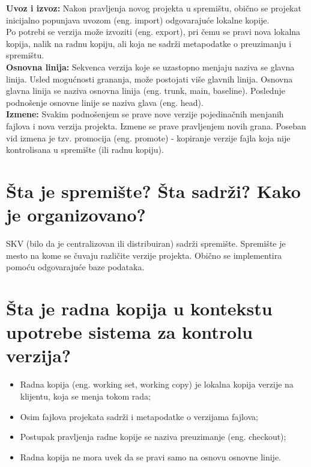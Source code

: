 \documentclass[a4paper]{article}
\begin{document}
  \textbf{Uvoz i izvoz:} Nakon pravljenja novog projekta u spremištu, obično se projekat inicijalno 
  popunjava uvozom (eng. import) odgovarajuće lokalne kopije.\\
  \indent Po potrebi se verzija može izvoziti (eng. export), pri čemu se pravi nova lokalna kopija, 
  nalik na radnu kopiju, ali koja ne sadrži metapodatke o preuzimanju i spremištu.\\
  
  \textbf{Osnovna linija:} Sekvenca verzija koje se uzastopno menjaju naziva se glavna linija. 
  Usled mogućnosti grananja, može postojati više glavnih linija. Osnovna glavna linija se naziva 
  osnovna linija (eng. trunk, main, baseline). Poslednje podnošenje osnovne linije se naziva 
  glava (eng. head).\\
  
  \textbf{Izmene:} Svakim podnošenjem se prave nove verzije pojedinačnih menjanih fajlova i 
  nova verzija projekta. Izmene se prave pravljenjem novih grana. Poseban vid izmena je tzv. 
  promocija (eng. promote) - kopiranje verzije fajla koja nije kontrolisana u spremište 
  (ili radnu kopiju).
   
\section{Šta je spremište? Šta sadrži? Kako je organizovano?}
  SKV (bilo da je centralizovan ili distribuiran) sadrži spremište. 
  Spremište je mesto na kome se čuvaju različite verzije projekta. 
  Obično se implementira pomoću odgovarajuće baze podataka.

\section{Šta je radna kopija u kontekstu upotrebe sistema za kontrolu verzija?}
  \begin{itemize}
    \item Radna kopija (eng. working set, working copy) je lokalna kopija verzije na klijentu, 
          koja se menja tokom rada;
    \item Osim fajlova projekata sadrži i metapodatke o verzijama fajlova;
    \item Postupak pravljenja radne kopije se naziva preuzimanje (eng. checkout);
    \item Radna kopija ne mora uvek da se pravi samo na osnovu osnovne linije.
  \end{itemize}
\end{document}
